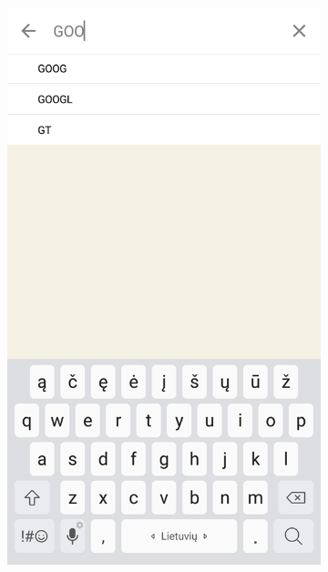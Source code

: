 \documentclass[a4paper,12pt,fleqn]{article}
\begin{document}
\begin{appendices}
\begin{figure}
\begin{subfigure}{0.5\textwidth}
		\includegraphics[width=0.8\linewidth]{stockSearch.png}
		\label{app:priedas6}
	\end{subfigure}
\end{figure}


\end{appendices}
\end{document}

